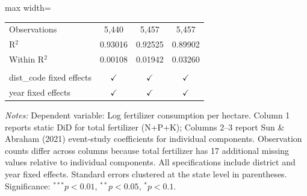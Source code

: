 \begin{table}[!ht]
\begin{adjustbox}{max width=\textwidth}
\begin{tabular}{lccc}
       \\
      Observations              & 5,440              & 5,457                & 5,457\\  
      R$^2$                     & 0.93016            & 0.92525              & 0.89902\\  
      Within R$^2$              & 0.00108            & 0.01942              & 0.03260\\  
       \\
      dist\_code fixed effects  & $\checkmark$       & $\checkmark$         & $\checkmark$\\   
      year fixed effects        & $\checkmark$       & $\checkmark$         & $\checkmark$\\   
      \bottomrule
   \end{tabular}
   \end{adjustbox}
   
   \par \raggedright \small
   \textit{Notes:} Dependent variable: Log fertilizer consumption per hectare. Column 1 reports static DiD for total fertilizer (N+P+K); Columns 2--3 report Sun \& Abraham (2021) event-study coefficients for individual components. Observation counts differ across columns because total fertilizer has 17 additional missing values relative to individual components. All specifications include district and year fixed effects. Standard errors clustered at the state level in parentheses. Significance: $^{***}p<0.01$, $^{**}p<0.05$, $^{*}p<0.1$.
\end{table}


